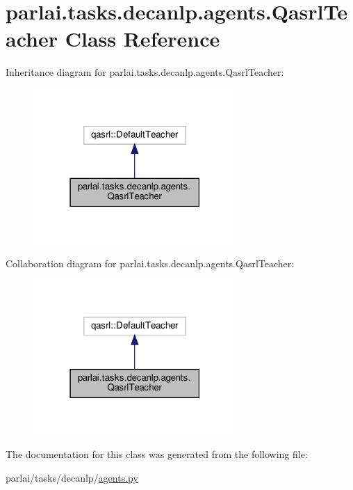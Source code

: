 \hypertarget{classparlai_1_1tasks_1_1decanlp_1_1agents_1_1QasrlTeacher}{}\section{parlai.\+tasks.\+decanlp.\+agents.\+Qasrl\+Teacher Class Reference}
\label{classparlai_1_1tasks_1_1decanlp_1_1agents_1_1QasrlTeacher}


Inheritance diagram for parlai.\+tasks.\+decanlp.\+agents.\+Qasrl\+Teacher\+:
\nopagebreak
\begin{figure}[H]
\begin{center}
\leavevmode
\includegraphics[width=219pt]{classparlai_1_1tasks_1_1decanlp_1_1agents_1_1QasrlTeacher__inherit__graph}
\end{center}
\end{figure}


Collaboration diagram for parlai.\+tasks.\+decanlp.\+agents.\+Qasrl\+Teacher\+:
\nopagebreak
\begin{figure}[H]
\begin{center}
\leavevmode
\includegraphics[width=219pt]{classparlai_1_1tasks_1_1decanlp_1_1agents_1_1QasrlTeacher__coll__graph}
\end{center}
\end{figure}


The documentation for this class was generated from the following file\+:\begin{DoxyCompactItemize}
\item 
parlai/tasks/decanlp/\hyperlink{parlai_2tasks_2decanlp_2agents_8py}{agents.\+py}\end{DoxyCompactItemize}
